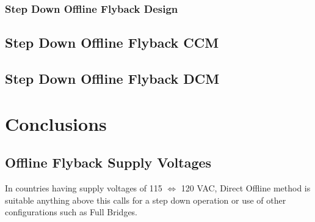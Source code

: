 \documentclass{article}
\begin{document}
\subsubsection[Step Down Flyback Converter Design]{Step Down Offline Flyback    Design}
\subsection[Step Down Offline Flyback  CCM]{Step Down Offline Flyback   CCM}
\subsection[Step Down Offline Flyback DCM]{Step Down Offline Flyback   DCM}

\section[Conclusions]{Conclusions}
\subsection[Offline Flyback Supply Voltages]{Offline Flyback Supply Voltages}
In countries having supply voltages of 115 $\Leftrightarrow$ 120 VAC, Direct Offline method is suitable anything above this calls for a step down operation or use of other configurations such as Full Bridges.
\end{document}
